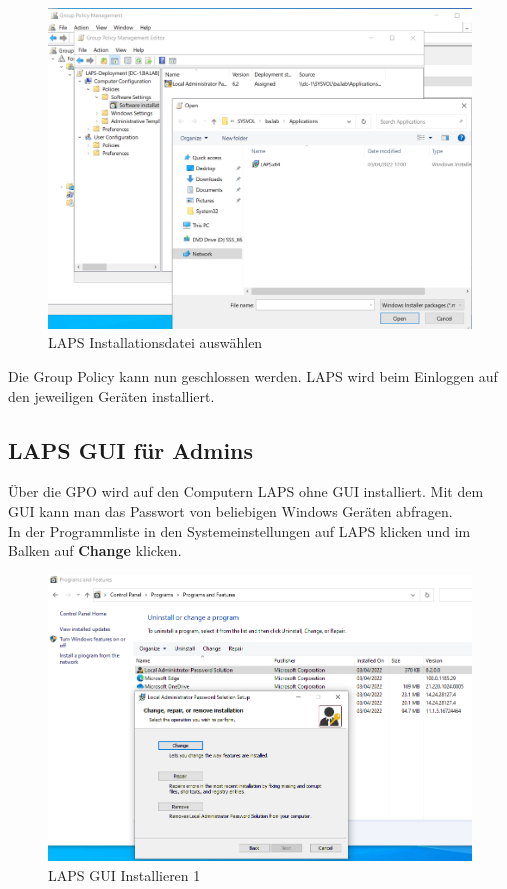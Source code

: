 \begin{figure}[H]
    \centering
    \includegraphics[width=0.7\linewidth]{../img/LAPS/GPO-Edit-Deployment-2.png}
    \caption{LAPS Installationsdatei auswählen}
\end{figure}
Die Group Policy kann nun geschlossen werden.
LAPS wird beim Einloggen auf den jeweiligen Geräten installiert.


\subsection{LAPS GUI für Admins}
Über die GPO wird auf den Computern LAPS ohne GUI installiert.
Mit dem GUI kann man das Passwort von beliebigen Windows Geräten abfragen.\\

In der Programmliste in den Systemeinstellungen auf LAPS klicken und im Balken auf \textbf{Change} klicken.
\begin{figure}[H]
    \centering
    \includegraphics[width=0.7\linewidth]{../img/LAPS/laps-ui-install.png}
    \caption{LAPS GUI Installieren 1}
\end{figure}

